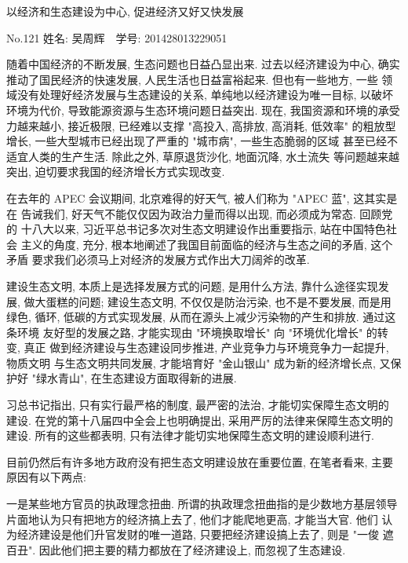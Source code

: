 \documentclass[nofonts, a4paper, oneside, 12pt]{article}
\begin{document}
\onehalfspacing
\begin{center}
    \Large{以经济和生态建设为中心, 促进经济又好又快发展}
\end{center}

\begin{center}
\small
No.121  姓名: 吴周辉\ \ 学号: 201428013229051
\end{center}

随着中国经济的不断发展, 生态问题也日益凸显出来. 过去以经济建设为中心,
确实推动了国民经济的快速发展, 人民生活也日益富裕起来. 但也有一些地方, 一些
领域没有处理好经济发展与生态建设的关系, 单纯地以经济建设为唯一目标, 以破坏
环境为代价, 导致能源资源与生态环境问题日益突出. 现在, 我国资源和环境的承受
力越来越小, 接近极限, 已经难以支撑 "高投入, 高排放, 高消耗, 低效率"
的粗放型增长, 一些大型城市已经出现了严重的 "城市病", 一些生态脆弱的区域
甚至已经不适宜人类的生产生活. 除此之外, 草原退货沙化, 地面沉降, 水土流失
等问题越来越突出, 迫切要求我国的经济增长方式实现改变.

在去年的 APEC 会议期间, 北京难得的好天气, 被人们称为 "APEC 蓝", 这其实是在
告诫我们, 好天气不能仅仅因为政治力量而得以出现, 而必须成为常态. 回顾党的
十八大以来, 习近平总书记多次对生态文明建设作出重要指示, 站在中国特色社会
主义的角度, 充分, 根本地阐述了我国目前面临的经济与生态之间的矛盾, 这个矛盾
要求我们必须马上对经济的发展方式作出大刀阔斧的改革.

建设生态文明, 本质上是选择发展方式的问题, 是用什么方法, 靠什么途径实现发展,
做大蛋糕的问题; 建设生态文明, 不仅仅是防治污染, 也不是不要发展, 而是用绿色,
循环, 低碳的方式实现发展, 从而在源头上减少污染物的产生和排放. 通过这条环境
友好型的发展之路, 才能实现由 "环境换取增长" 向 "环境优化增长" 的转变, 真正
做到经济建设与生态建设同步推进, 产业竞争力与环境竞争力一起提升, 物质文明
与生态文明共同发展, 才能培育好 "金山银山" 成为新的经济增长点, 又保护好 
"绿水青山", 在生态建设方面取得新的进展.

习总书记指出, 只有实行最严格的制度, 最严密的法治, 才能切实保障生态文明的
建设. 在党的第十八届四中全会上也明确提出, 采用严厉的法律来保障生态文明的
建设. 所有的这些都表明, 只有法律才能切实地保障生态文明的建设顺利进行.

目前仍然后有许多地方政府没有把生态文明建设放在重要位置, 在笔者看来, 主要
原因有以下两点:

一是某些地方官员的执政理念扭曲. 所谓的执政理念扭曲指的是少数地方基层领导
片面地认为只有把地方的经济搞上去了, 他们才能爬地更高, 才能当大官. 他们 
认为经济建设是他们升官发财的唯一道路, 只要把经济建设搞上去了, 则是 "一俊
遮百丑". 因此他们把主要的精力都放在了经济建设上, 而忽视了生态建设.
\end{document}
